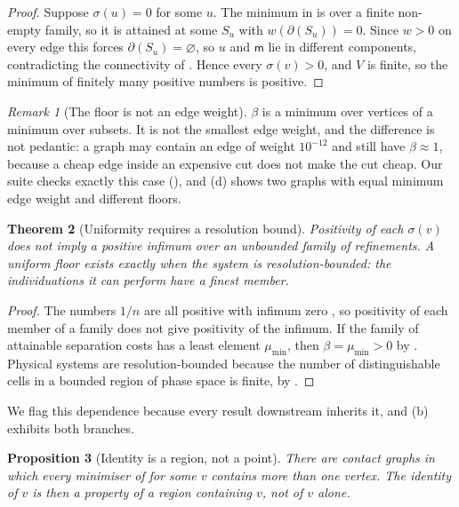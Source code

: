 \documentclass[11pt,twocolumn,a4paper]{article}
\theoremstyle{thmstyle}
\newtheorem{theorem}{Theorem}[section]
\newtheorem{proposition}[theorem]{Proposition}
\theoremstyle{definition}
\theoremstyle{remark}
\newtheorem{remark}[theorem]{Remark}
\newcommand{\med}{\mathsf{m}}
\newcommand{\flo}{\beta}
\newcommand{\cut}{\partial}
\newcommand{\sepc}{\sigma}
\begin{document}
\begin{proof}
Suppose $\sepc(u)=0$ for some $u$. The minimum in  is over a
finite non-empty family, so it is attained at some $S_u$ with
$w(\cut(S_u))=0$. Since $w>0$ on every edge this forces
$\cut(S_u)=\varnothing$, so $u$ and $\med$ lie in different components,
contradicting the connectivity of . Hence every
$\sepc(v)>0$, and $V$ is finite, so the minimum of finitely many positive
numbers is positive.
\end{proof}

\begin{remark}[The floor is not an edge weight]
\label{rem:notedge}
$\flo$ is a minimum over vertices of a minimum over subsets. It is not the
smallest edge weight, and the difference is not pedantic: a graph may contain
an edge of weight $10^{-12}$ and still have $\flo \approx 1$, because a cheap
edge inside an expensive cut does not make the cut cheap. Our suite checks
exactly this case (), and (d) shows two
graphs with equal minimum edge weight and different floors.
\end{remark}

\begin{theorem}[Uniformity requires a resolution bound]
\label{thm:uniform}
Positivity of each $\sepc(v)$ does not imply a positive infimum over an
unbounded family of refinements. A uniform floor exists exactly when the
system is \emph{resolution-bounded}: the individuations it can perform have a
finest member.
\end{theorem}

\begin{proof}
The numbers $1/n$ are all positive with infimum zero \citep{rudin1976}, so
positivity of each member of a family does not give positivity of the
infimum. If the family of
attainable separation costs has a least element $\mu_{\min}$, then
$\flo=\mu_{\min}>0$ by . Physical systems are
resolution-bounded because the number of distinguishable cells in a bounded
region of phase space is finite, by .
\end{proof}

We flag this dependence because every result downstream inherits it, and
(b) exhibits both branches.

\begin{proposition}[Identity is a region, not a point]
\label{prop:region}
There are contact graphs in which every minimiser of  for
some $v$ contains more than one vertex. The identity of $v$ is then a property
of a region containing $v$, not of $v$ alone.
\end{proposition}
\end{document}
